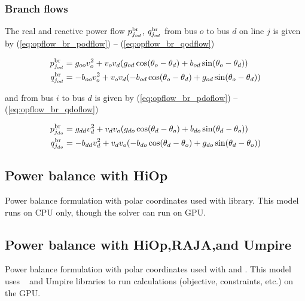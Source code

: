 \subsubsection{Branch flows}
The real and reactive power flow $p^\text{br}_{j_{od}}$, $q^\text{br}_{j_{od}}$  from bus $o$ to bus $d$ on line $j$ is given by (\ref{eq:opflow_br_podflow}) -- 
 (\ref{eq:opflow_br_qodflow})


\begin{align}
p^\text{br}_{j_{od}} &= g_{oo}{v^2_o} + v_ov_d(g_{od}\cos(\theta_o - \theta_d) + b_{od}\sin(\theta_o - \theta_d)) \label{eq:opflow_br_podflow}\\
q^\text{br}_{j_{od}} &= -b_{oo}{v^2_o} + v_ov_d(-b_{od}\cos(\theta_o - \theta_d) + g_{od}\sin(\theta_o - \theta_d)) \label{eq:opflow_br_qodflow}
\end{align}

and from bus $i$ to bus $d$ is given by (\ref{eq:opflow_br_pdoflow}) -- (\ref{eq:opflow_br_qdoflow})

\begin{align}
p^\text{br}_{j_{do}} &= g_{dd}{v^2_d} + v_dv_o(g_{do}\cos(\theta_d - \theta_o) + b_{do}\sin(\theta_d - \theta_o))  \label{eq:opflow_br_pdoflow} \\
q^\text{br}_{j_{do}} &= -b_{dd}{v^2_d} + v_dv_o(-b_{do}\cos(\theta_d - \theta_o) + g_{do}\sin(\theta_d - \theta_o)) \label{eq:opflow_br_qdoflow}
\end{align}

\begin{comment}
\subsection{Power balance cartesian}
\end{comment}

\subsection{Power balance with HiOp}
Power balance formulation with polar coordinates used with \hiop \cite{hiop-manual} library. This model runs on CPU only, though the \hiop solver can run on GPU.

\subsection{Power balance with HiOp,RAJA,and Umpire}
Power balance formulation with polar coordinates used with \hiop and \raja. This model uses \raja~\cite{beckingsale2019raja} and Umpire \cite{beckingsale2019umpire} libraries to run \opflow calculations (objective, constraints, etc.) on the GPU. 

